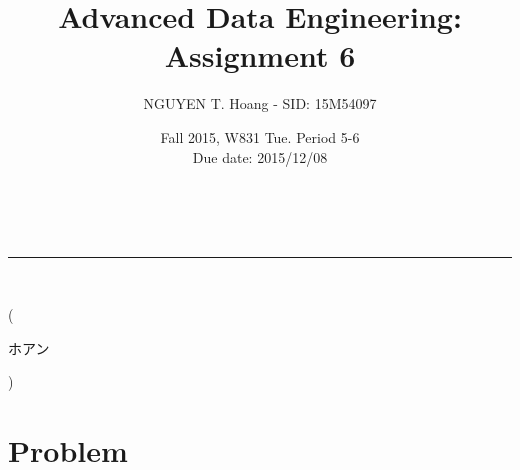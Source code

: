 \documentclass[a4paper,12pt]{article}
\makeatletter
\newcommand{\linia}{\rule{\linewidth}{0.5pt}}
\renewcommand{\maketitle} {
\begin{center}
\vspace{2ex}
{\LARGE \textsc{\@title}}
\vspace{1ex}
\\
\linia\\
\@author \hfill \@date
\vspace{4ex}
\end{center}
}
\makeatother
\begin{document}
\title{Advanced Data Engineering: Assignment 6}

\author{NGUYEN T. Hoang - SID: 15M54097}

\date{Fall 2015, W831 Tue. Period 5-6 \\ \hfill Due date: 2015/12/08}

\maketitle
\vspace{-4.5em}
\hspace{5.3em} (\begin{CJK}{UTF8}{min}ホアン\end{CJK})
\vspace{6em}
\section*{Problem}
\end{document}
